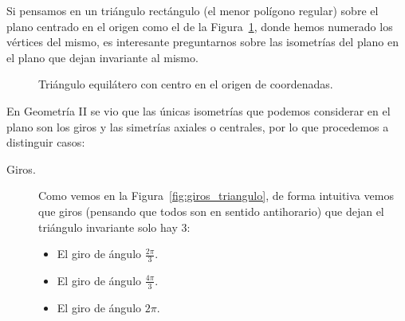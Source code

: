 \begin{ejemplo}
    Si pensamos en un triángulo rectángulo (el menor polígono regular) sobre el plano centrado en el origen como el de la Figura~\ref{fig:triangulo}, donde hemos numerado los vértices del mismo, es interesante preguntarnos sobre las isometrías del plano en el plano que dejan invariante al mismo.
    \begin{figure}[H]
        \centering
        \caption{Triángulo equilátero con centro en el origen de coordenadas.}
        \label{fig:triangulo}
    \end{figure}

    En Geometría II se vio que las únicas isometrías que podemos considerar en el plano son los giros y las simetrías axiales o centrales, por lo que procedemos a distinguir casos:
    \begin{description}
        \item [Giros.] Como vemos en la Figura~\ref{fig:giros_triangulo}, de forma intuitiva vemos que giros (pensando que todos son en sentido antihorario) que dejan el triángulo invariante solo hay 3:
            \begin{itemize}
                \item El giro de ángulo $\frac{2\pi}{3}$.
                \item El giro de ángulo $\frac{4\pi}{3}$.
                \item El giro de ángulo $2\pi$.
            \end{itemize}
            \begin{figure}[H]
                \centering
\end{figure}
\end{description}
\end{ejemplo}
